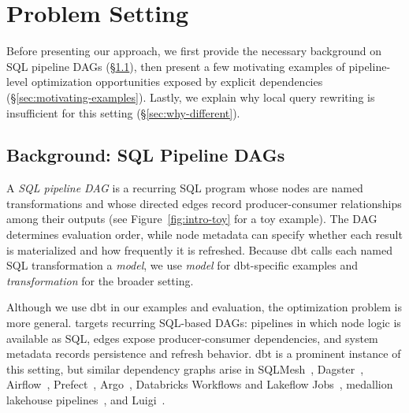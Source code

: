 \section{Problem Setting}
\label{sec:motivating}

Before presenting our approach, we first provide the necessary background on SQL pipeline DAGs (\S\ref{sec:dbt-setting}), then present a few motivating examples of pipeline-level optimization opportunities exposed by explicit dependencies (\S\ref{sec:motivating-examples}). Lastly, we explain why local query rewriting is insufficient for this setting (\S\ref{sec:why-different}).

\subsection{Background: SQL Pipeline DAGs}
\label{sec:dbt-setting}

 A \emph{SQL pipeline DAG} is a recurring SQL program whose nodes are named transformations and whose directed edges record producer-consumer relationships among their outputs (see Figure~\ref{fig:intro-toy} for a toy example). The DAG determines evaluation order, while node metadata can specify whether each result is materialized and how frequently it is refreshed. Because dbt calls each named SQL transformation a \emph{model}, we use \emph{model} for dbt-specific examples and \emph{transformation} for the broader setting. 
 

Although we use dbt in our examples and evaluation, the optimization problem is more general. \tool targets recurring SQL-based DAGs: pipelines in which node logic is available as SQL, edges expose producer-consumer dependencies, and system metadata records persistence and refresh behavior. dbt is a prominent instance of this setting, but similar dependency graphs arise in SQLMesh~\cite{sqlmeshOverview}, Dagster~\cite{dagsterAssets}, Airflow~\cite{airflowDags}, Prefect~\cite{prefectTasks}, Argo~\cite{argoDag}, Databricks Workflows and Lakeflow Jobs~\cite{databricksJobs}, medallion lakehouse pipelines~\cite{databricksMedallion}, and Luigi~\cite{luigiDocs}.

